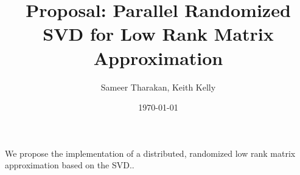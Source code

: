 \documentclass[a4paper]{article}
\title{Proposal: Parallel Randomized SVD for Low Rank Matrix Approximation}
\date{\today}
\author{Sameer Tharakan, Keith Kelly}
\begin{document}
\maketitle

We propose the implementation of a distributed, randomized low rank matrix approximation based on the SVD.\cite{halko2011finding}.

{
}
\end{document}
